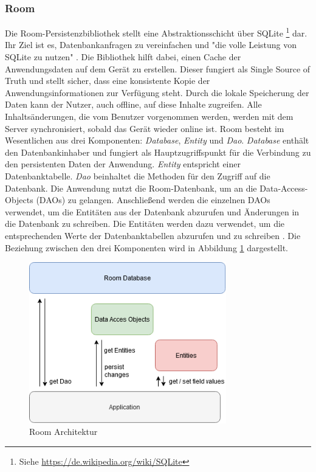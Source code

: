 \documentclass[a4paper]{article}
\begin{document}
\subsubsection{Room}
\label{subsubsec:technologies:bibs:room}
Die Room-Persistenzbibliothek stellt eine Abstraktionsschicht über SQLite \footnote{Siehe \url{https://de.wikipedia.org/wiki/SQLite}} dar. Ihr Ziel ist es, Datenbankanfragen zu vereinfachen und "die volle Leistung von SQLite zu nutzen" \cite{android_room_architecture}. Die Bibliothek hilft dabei, einen Cache der Anwendungsdaten auf dem Gerät zu erstellen. Dieser fungiert als Single Source of Truth und stellt sicher, dass eine konsistente Kopie der Anwendungsinformationen zur Verfügung steht. Durch die lokale Speicherung der Daten kann der Nutzer, auch offline, auf diese Inhalte zugreifen. Alle Inhaltsänderungen, die vom Benutzer vorgenommen werden, werden mit dem Server synchronisiert, sobald das Gerät wieder online ist.\newline
Room besteht im Wesentlichen aus drei Komponenten: \textit{Database}, \textit{Entity} und \textit{Dao}. \textit{Database} enthält den Datenbankinhaber und fungiert als Hauptzugriffspunkt für die Verbindung zu den persistenten Daten der Anwendung. \textit{Entity} entspricht einer Datenbanktabelle. \textit{Dao} beinhaltet die Methoden für den Zugriff auf die Datenbank. Die Anwendung nutzt die Room-Datenbank, um an die Data-Access-Objects (DAOs) zu gelangen. Anschließend werden die einzelnen DAOs verwendet, um die Entitäten aus der Datenbank abzurufen und Änderungen in die Datenbank zu schreiben. Die Entitäten werden dazu verwendet, um die entsprechenden Werte der Datenbanktabellen abzurufen und zu schreiben \cite{android_room_data_storage}. Die Beziehung zwischen den drei Komponenten wird in Abbildung \ref{fig:room} dargestellt.

\begin{figure}[H]
	\centering
	\includegraphics[height=7cm,keepaspectratio]{./images/Room.png}
	\caption{Room Architektur}
	\label{fig:room}
\end{figure}
\end{document}
